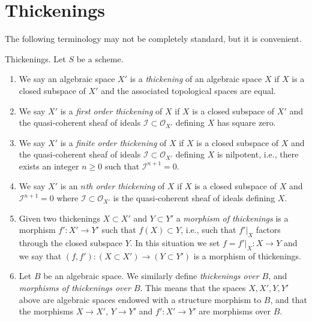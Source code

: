 \section{Thickenings}
\label{section-thickenings}

\noindent
The following terminology may not be completely standard, but it is convenient.

\begin{definition}
\label{definition-thickening}
Thickenings. Let $S$ be a scheme.
\begin{enumerate}
\item We say an algebraic space $X'$ is a {\it thickening} of an algebraic
space $X$ if $X$ is a closed subspace of $X'$ and the associated topological
spaces are equal.
\item We say $X'$ is a {\it first order thickening} of $X$ if
$X$ is a closed subspace of $X'$ and the quasi-coherent sheaf of ideals
$\mathcal{I} \subset \mathcal{O}_{X'}$ defining $X$ has square zero.
\item We say $X'$ is a {\it finite order thickening} of $X$
if $X$ is a closed subspace of $X$ and the quasi-coherent sheaf of ideals
$\mathcal{I} \subset \mathcal{O}_{X'}$ defining $X$ is nilpotent, i.e.,
there exists an integer $n \geq 0$ such that $\mathcal{I}^{n + 1} = 0$.
\item We say $X'$ is an {\it $n$th order thickening} of $X$
if $X$ is a closed subspace of $X$ and $\mathcal{I}^{n + 1} = 0$
where $\mathcal{I} \subset \mathcal{O}_{X'}$ is the
quasi-coherent sheaf of ideals defining $X$.
\item Given two thickenings $X \subset X'$ and $Y \subset Y'$ a
{\it morphism of thickenings} is a morphism $f' : X' \to Y'$ such that
$f(X) \subset Y$, i.e., such that $f'|_X$ factors through the closed
subspace $Y$. In this situation we set $f = f'|_X : X \to Y$ and we say
that $(f, f') : (X \subset X') \to (Y \subset Y')$ is a morphism of
thickenings.
\item Let $B$ be an algebraic space. We similarly define
{\it thickenings over $B$}, and
{\it morphisms of thickenings over $B$}. This means that the spaces
$X, X', Y, Y'$ above are algebraic spaces endowed with a structure
morphism to $B$, and that the morphisms
$X \to X'$, $Y \to Y'$ and $f' : X' \to Y'$ are morphisms over $B$.
\end{enumerate}
\end{definition}

